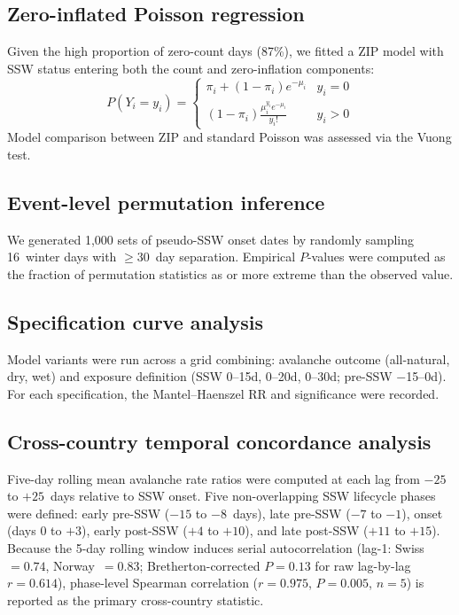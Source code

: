 \documentclass[11pt,a4paper]{article}
\begin{document}
\subsection{Zero-inflated Poisson regression}

Given the high proportion of zero-count days (87\%), we fitted a ZIP model with SSW status entering both the count and zero-inflation components:
\[
P(Y_i = y_i) = \begin{cases}
\pi_i + (1 - \pi_i) e^{-\mu_i} & y_i = 0 \\
(1 - \pi_i) \frac{\mu_i^{y_i} e^{-\mu_i}}{y_i!} & y_i > 0
\end{cases}
\]
Model comparison between ZIP and standard Poisson was assessed via the Vuong test.

\subsection{Event-level permutation inference}

We generated 1,000 sets of pseudo-SSW onset dates by randomly sampling 16~winter days with $\geq 30$~day separation. Empirical $P$-values were computed as the fraction of permutation statistics as or more extreme than the observed value.

\subsection{Specification curve analysis}

Model variants were run across a grid combining: avalanche outcome (all-natural, dry, wet) and exposure definition (SSW 0--15d, 0--20d, 0--30d; pre-SSW $-$15--0d). For each specification, the Mantel--Haenszel RR and significance were recorded.

\subsection{Cross-country temporal concordance analysis}

Five-day rolling mean avalanche rate ratios were computed at each lag from $-25$ to $+25$~days relative to SSW onset. Five non-overlapping SSW lifecycle phases were defined: early pre-SSW ($-15$ to $-8$~days), late pre-SSW ($-7$ to $-1$), onset (days $0$ to $+3$), early post-SSW ($+4$ to $+10$), and late post-SSW ($+11$ to $+15$). Because the 5-day rolling window induces serial autocorrelation (lag-1: Swiss~$= 0.74$, Norway~$= 0.83$; Bretherton-corrected $P = 0.13$ for raw lag-by-lag $r = 0.614$), phase-level Spearman correlation ($r = 0.975$, $P = 0.005$, $n = 5$) is reported as the primary cross-country statistic.
\end{document}

